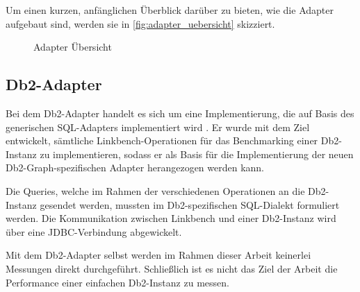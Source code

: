 Um einen kurzen, anfänglichen Überblick darüber zu bieten, wie die Adapter aufgebaut sind, werden sie in \autoref{fig:adapter_uebersicht} skizziert.

\begin{figure}[!ht]
    \centering
	\usetikzlibrary{arrows, arrows.meta}
    \caption{Adapter Übersicht}
    \label{fig:adapter_uebersicht}
\end{figure}


\subsection{Db2-Adapter}
\label{implementierung:adapter:db2}
Bei dem Db2-Adapter handelt es sich um eine Implementierung, die auf Basis des generischen SQL-Adapters implementiert wird \cite{mc_linkbench_github}. Er wurde mit dem Ziel entwickelt, sämtliche Linkbench-Operationen für das Benchmarking einer Db2-Instanz zu implementieren, sodass er als Basis für die Implementierung der neuen Db2-Graph-spezifischen Adapter herangezogen werden kann.

Die Queries, welche im Rahmen der verschiedenen Operationen an die Db2-Instanz gesendet werden, mussten im Db2-spezifischen SQL-Dialekt formuliert werden. Die Kommunikation zwischen Linkbench und einer Db2-Instanz wird über eine JDBC-Verbindung abgewickelt. 

Mit dem Db2-Adapter selbst werden im Rahmen dieser Arbeit keinerlei Messungen direkt durchgeführt. Schließlich ist es nicht das Ziel der Arbeit die Performance einer einfachen Db2-Instanz zu messen. 

